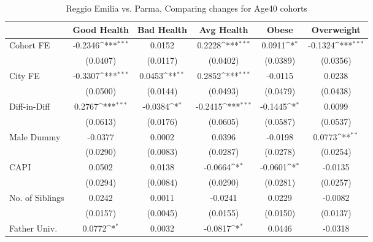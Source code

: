 \begin{table}[htbp]\centering
\def\sym#1{\ifmmode^{#1}\else\(^{#1}\)\fi}
\caption{Reggio Emilia vs. Parma, Comparing changes for Age40 cohorts}
\begin{tabular}{l*{5}{c}}
\toprule
            &\multicolumn{1}{c}{Good Health}&\multicolumn{1}{c}{Bad Health}&\multicolumn{1}{c}{Avg Health}&\multicolumn{1}{c}{Obese}&\multicolumn{1}{c}{Overweight}\\
\midrule
Cohort FE   &     -0.2346\sym{***}&      0.0152         &      0.2228\sym{***}&      0.0911\sym{*}  &     -0.1324\sym{***}\\
            &    (0.0407)         &    (0.0117)         &    (0.0402)         &    (0.0389)         &    (0.0356)         \\
\addlinespace
City FE     &     -0.3307\sym{***}&      0.0453\sym{**} &      0.2852\sym{***}&     -0.0115         &      0.0238         \\
            &    (0.0500)         &    (0.0144)         &    (0.0493)         &    (0.0479)         &    (0.0438)         \\
\addlinespace
Diff-in-Diff&      0.2767\sym{***}&     -0.0384\sym{*}  &     -0.2415\sym{***}&     -0.1445\sym{*}  &      0.0099         \\
            &    (0.0613)         &    (0.0176)         &    (0.0605)         &    (0.0587)         &    (0.0537)         \\
\addlinespace
Male Dummy  &     -0.0377         &      0.0002         &      0.0396         &     -0.0198         &      0.0773\sym{**} \\
            &    (0.0290)         &    (0.0083)         &    (0.0287)         &    (0.0278)         &    (0.0254)         \\
\addlinespace
CAPI        &      0.0502         &      0.0138         &     -0.0664\sym{*}  &     -0.0601\sym{*}  &     -0.0135         \\
            &    (0.0294)         &    (0.0084)         &    (0.0290)         &    (0.0281)         &    (0.0257)         \\
\addlinespace
No. of Siblings&      0.0242         &      0.0011         &     -0.0241         &      0.0229         &     -0.0082         \\
            &    (0.0157)         &    (0.0045)         &    (0.0155)         &    (0.0150)         &    (0.0137)         \\
\addlinespace
Father Univ.&      0.0772\sym{*}  &      0.0032         &     -0.0817\sym{*}  &      0.0446         &     -0.0318         \\

\end{tabular}
\end{table}
